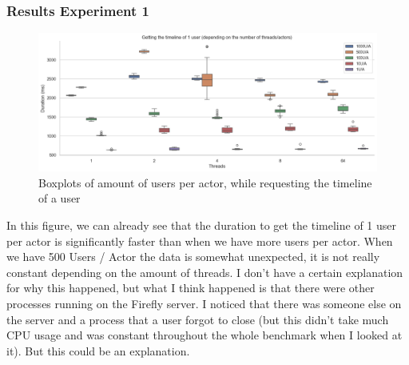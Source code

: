 \documentclass[a4paper]{article}
\begin{document}
\subsubsection{Results Experiment 1}
\begin{figure}[H]
	\centering
	\includegraphics[width = \linewidth]{Images/Speedup(U:A)Box.png}
	\caption{Boxplots of amount of users per actor, while requesting the timeline of a user}
\end{figure}
In this figure, we can already see that the duration to get the timeline of 1 user per actor is significantly faster than when we have more users per actor. When we have 500 Users / Actor the data is somewhat unexpected, it is not really constant depending on the amount of threads. I don't have a certain explanation for why this happened, but what I think happened is that there were other processes running on the Firefly server. I noticed that there was someone else on the server and a process that a user forgot to close (but this didn't take much CPU usage and was constant throughout the whole benchmark when I looked at it). But this could be an explanation.
\end{document}
